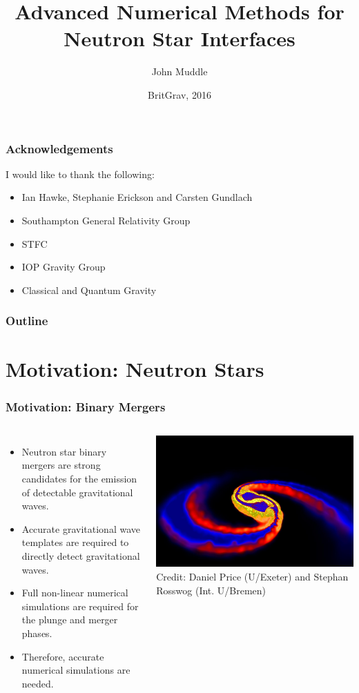 \documentclass{beamer}
\title[Advanced Numerical Methods for Neutron Star Interfaces] %
{Advanced Numerical Methods for \\
Neutron Star Interfaces}
\subtitle{}
\author[John Muddle - @john$\_$muddle] %
{John Muddle}
\institute[University of Southampton] %
{
  Mathematical Sciences\\
  University of Southampton\\[1\baselineskip]
  Supervisor - Dr Ian Hawke

}
\date[Britgrav 2016] %
{BritGrav, 2016}
\begin{document}
\begin{frame}
  \titlepage
\end{frame}
\begin{frame}
\frametitle{Acknowledgements}
I would like to thank the following:
\begin{itemize}
\item{Ian Hawke, Stephanie Erickson and Carsten Gundlach}
\item{Southampton General Relativity Group}
\item{STFC}
\item{IOP Gravity Group}
\item{Classical and Quantum Gravity}
\end{itemize}
\end{frame}
 \begin{frame}
   \frametitle{Outline}
   \tableofcontents
 \end{frame}
\section{Motivation: Neutron Stars}

\begin{frame}
\frametitle{Motivation: Binary Mergers}
\begin{columns}
\begin{itemize}
\item{Neutron star binary mergers are strong candidates for the emission of detectable gravitational waves.}
\item{Accurate gravitational wave templates are required to directly detect gravitational waves.}
\item{Full non-linear numerical simulations are required for the plunge and merger phases.}
\item{Therefore, accurate numerical simulations are needed.}
\end{itemize}
\includegraphics[width=\textwidth]{../images/price_rosswog_press_1}\\
\tiny Credit: Daniel Price (U/Exeter) and Stephan Rosswog (Int. U/Bremen)
\end{columns}
\end{frame}
\end{document}
